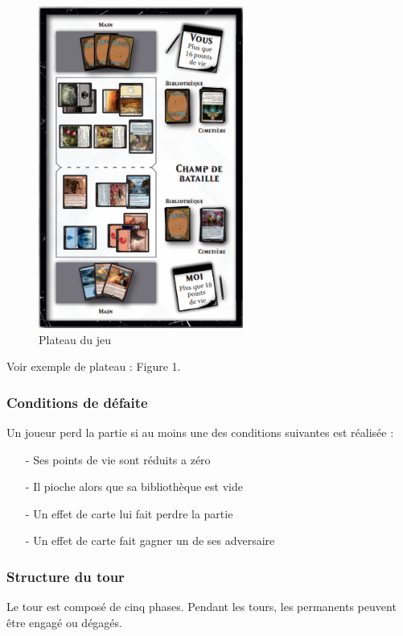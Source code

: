\documentclass[a4paper,12pt]{article}
\begin{document}
\begin{description}
\begin{figure}[h]
\begin{center}
\includegraphics[width=0.6\textwidth]{Plateau.PNG}
\caption{\label{Plateau-du-jeu}Plateau du jeu}
\end{center}
\end{figure}



\end{description}

Voir exemple de plateau : Figure 1.

\subsubsection{Conditions de défaite}
Un joueur perd la partie si au moins une des conditions suivantes est réalisée : 

\begin{itemize}
\item[-] Ses points de vie sont réduits a zéro
\item[-] Il pioche alors que sa bibliothèque est vide
\item[-] Un effet de carte lui fait perdre la partie
\item[-] Un effet de carte fait gagner un de ses adversaire
\end{itemize}

\subsubsection{Structure du tour}
Le tour est composé de cinq phases.
Pendant les tours, les permanents peuvent être engagé ou dégagés.
\end{document}
